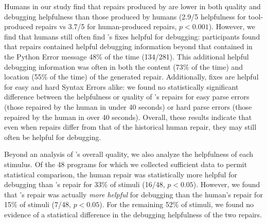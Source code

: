  Humans in our study find that repairs produced by
\toolname are lower in both quality and debugging helpfulness than those produced 
by humans (2.9/5 helpfulness for tool-produced repairs vs 3.7/5 for human-produced 
repairs, $p < 0.001$). However, we find that humans still often find \toolname's fixes 
helpful for debugging: participants found that \toolname repairs contained helpful 
debugging information beyond that contained in the Python Error message 48\% of 
the time (134/281). This additional helpful debugging information was often in both
the content (73\% of the time) and location (55\% of the time) of the generated
repair. Additionally, \toolname fixes are helpful for easy and hard Syntax Errors
alike: we found no statistically significant difference between the helpfulness or
quality of \toolname's repairs for easy parse errors (those repaired by the human in under
40 seconds) or hard parse errors (those repaired by the human in over 40 seconds). %
Overall, these results indicate that even when \toolname repairs differ from
that of the historical human repair, they may still often be helpful for debugging.

 Beyond an analysis of \toolname's overall quality, we also 
analyze the helpfulness of each stimulus. %
Of the 48 programs for which we collected sufficient data to permit statistical 
comparison, the human repair was statistically more helpful for debugging than \toolname's
repair for 33\% of stimuli (16/48, $p<0.05$). However, we found that \toolname's
repair was actually \emph{more helpful} for debugging than the human's repair for 15\% of
stimuli (7/48, $p<0.05$). For the remaining 52\% of stimuli, we found no evidence of a 
statistical difference in the debugging helpfulness of the two repairs.


